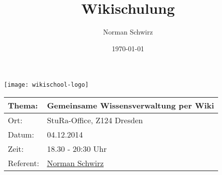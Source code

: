 \documentclass{beamer}
\title{Wikischulung}
\author{Norman Schwirz}
\date{\today}
\begin{document}
\begin{frame} %

  \begin{center}
    \texttt{[image: wikischool-logo]}
    \begin{longtable}{|l|l|}
      \hline
       
       \textbf{Thema:}                                    &  \textbf{Gemeinsame Wissensverwaltung per Wiki}                                    \\ 
      \hline
       
       Ort:                                          &  StuRa-Office, Z124 Dresden                                                                  \\ 
      \hline
       
       Datum:                                        &  04.12.2014                                                                   \\ 
      \hline
       
       Zeit:                                         &  18.30 - 20:30 Uhr                                                            \\ 
      \hline
       
       Referent:                                     &  \href{http://www2.htw-dresden.de/~s70341/cgi-bin/dokuwiki/doku.php?id=user:norman}{Norman Schwirz}  \\ 
      \hline
       
    \end{longtable}
  \end{center}
\end{frame}


 
\end{document}
